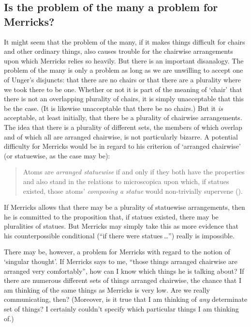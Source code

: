 \documentclass[11pt]{article}
\newenvironment{squote}{%
	\begin{quote}\begin{singlespace}%
	}{%
	\end{singlespace}\end{quote}}
\begin{document}
\begin{spacing}{1.5}
\subsection{Is the problem of the many a problem for Merricks?}
\label{many-merricks}
It might seem that the problem of the many, if it makes things
difficult for chairs and other ordinary things, also causes trouble
for the chairwise arrangements upon which Merricks relies so heavily.
But there is an important disanalogy.  The problem of the many is only
a problem as long as we are unwilling to accept one of Unger's
disjuncts: that there are no chairs or that there are a plurality
where we took there to be one.  Whether or not it is part of the
meaning of `chair' that there is not an overlapping plurality of
chairs, it is simply unacceptable that this be the case.  (It is
likewise unacceptable that there be no chairs.)  But it {\em is}
acceptable, at least initially, that there be a plurality of chairwise
arrangements.  The idea that there is a plurality of different sets,
the members of which overlap and of which all are arranged chairwise,
is not particularly bizarre.  A potential difficulty for Merricks
would be in regard to his criterion of `arranged chairwise' (or
statuewise, as the case may be):

\begin{squote}
Atoms are \emph{arranged statuewise} if and only if they both have the
properties and also stand in the relations to microscopica upon which,
if statues existed, those atoms' \emph{composing a statue} would
non-trivially supervene (\citeyear[4]{merricks2001a}).
\end{squote}

If Merricks allows that there may be a plurality of statuewise
arrangements, then he is committed to the proposition that, if statues
existed, there may be pluralities of statues.  But Merricks may simply
take this as more evidence that his counterpossible conditional (``if
there were statues\,\ldots '') really is impossible.

There may be, however, a problem for Merricks with regard to the
notion of `singular thought'.  If Merricks says to me, ``those things
arranged chairwise are arranged very comfortably'', how can I know
which things he is talking about?  If there are numerous different
sets of things arranged chairwise, the chance that I am thinking of
the same things as Merricks is very low.  Are we really communicating,
then?  (Moreover, is it true that I am thinking of {\em any}
determinate set of things?  I certainly couldn't specify which
particular things I am thinking of.)


\end{spacing}
\end{document}
